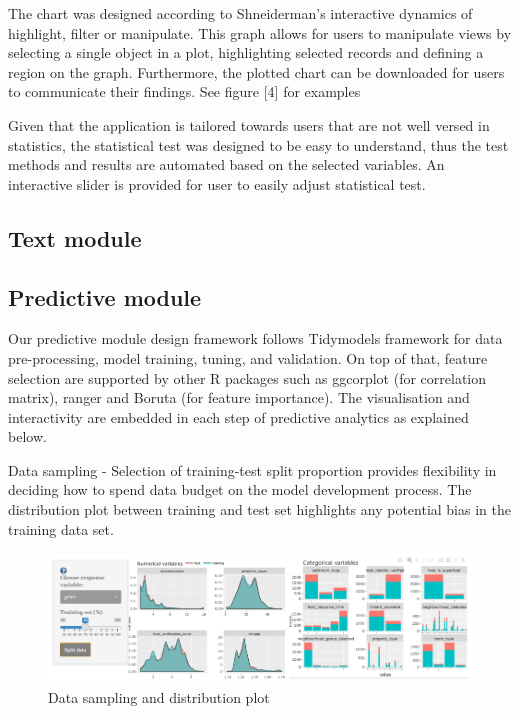\documentclass{acm_proc_article-sp}
\begin{document}
The chart was designed according to Shneiderman's interactive dynamics
of highlight, filter or manipulate. This graph allows for users to
manipulate views by selecting a single object in a plot, highlighting
selected records and defining a region on the graph. Furthermore, the
plotted chart can be downloaded for users to communicate their findings.
See figure {[}4{]} for examples

Given that the application is tailored towards users that are not well
versed in statistics, the statistical test was designed to be easy to
understand, thus the test methods and results are automated based on the
selected variables. An interactive slider is provided for user to easily
adjust statistical test.

\hypertarget{text-module}{%
\subsection{Text module}\label{text-module}}

\hypertarget{predictive-module}{%
\subsection{Predictive module}\label{predictive-module}}

Our predictive module design framework follows Tidymodels framework for
data pre-processing, model training, tuning, and validation. On top of
that, feature selection are supported by other R packages such as
ggcorplot (for correlation matrix), ranger and Boruta (for feature
importance). The visualisation and interactivity are embedded in each
step of predictive analytics as explained below.

Data sampling - Selection of training-test split proportion provides
flexibility in deciding how to spend data budget on the model
development process. The distribution plot between training and test set
highlights any potential bias in the training data set.

\begin{figure}[H]

{\centering \includegraphics[width=1\linewidth]{images/datasplit} 

}

\caption{Data sampling and distribution plot}\label{fig:unnamed-chunk-5}
\end{figure}
\end{document}

